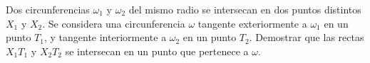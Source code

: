 Dos circunferencias $\omega_1$ y $\omega_2$ del mismo radio se intersecan en dos puntos distintos
$X_1$ y $X_2$. Se considera una circunferencia $\omega$ tangente exteriormente a $\omega_1$ en un punto $T_1$, y tangente
interiormente a $\omega_2$ en un punto $T_2$. Demostrar que las rectas $X_1T_1$ y $X_2T_2$ se intersecan en un punto
que pertenece a $\omega$.
